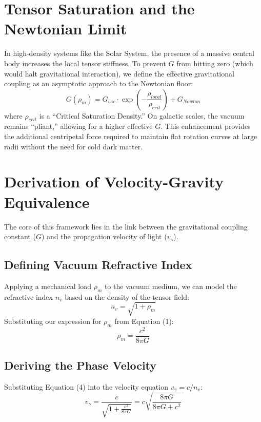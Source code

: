 \documentclass[12pt,a4paper]{article}
\begin{document}
\section{Tensor Saturation and the Newtonian Limit}
In high-density systems like the Solar System, the presence of a massive central body increases the local tensor stiffness. To prevent $G$ from hitting zero (which would halt gravitational interaction), we define the effective gravitational coupling as an asymptotic approach to the Newtonian floor:
\begin{equation}
G(\rho_m) = G_{vac} \cdot \exp\left(-\frac{\rho_{local}}{\rho_{crit}}\right) + G_{Newton}
\end{equation}
where $\rho_{crit}$ is a ``Critical Saturation Density.'' On galactic scales, the vacuum remains ``pliant,'' allowing for a higher effective $G$. This enhancement provides the additional centripetal force required to maintain flat rotation curves at large radii without the need for cold dark matter.

\section{Derivation of Velocity-Gravity Equivalence}
The core of this framework lies in the link between the gravitational coupling constant ($G$) and the propagation velocity of light ($v_{\gamma}$).

\subsection{Defining Vacuum Refractive Index}
Applying a mechanical load $\rho_m$ to the vacuum medium, we can model the refractive index $n_v$ based on the density of the tensor field:
\begin{equation}
n_v = \sqrt{1 + \rho_m}
\end{equation}
Substituting our expression for $\rho_m$ from Equation (1):
\begin{equation}
\rho_m = \frac{c^2}{8\pi G}
\end{equation}

\subsection{Deriving the Phase Velocity}
Substituting Equation (4) into the velocity equation $v_{\gamma} = c/n_v$:
\begin{equation}
v_{\gamma} = \frac{c}{\sqrt{1 + \frac{c^2}{8\pi G}}} = c \sqrt{\frac{8\pi G}{8\pi G + c^2}}
\end{equation}
\end{document}
